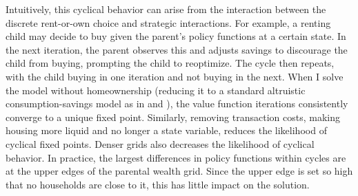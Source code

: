 \documentclass[12pt]{article}
\begin{document}
Intuitively, this cyclical behavior can arise from the interaction between the discrete rent-or-own choice and strategic interactions. For example, a renting child may decide to buy given the parent's policy functions at a certain state. In the next iteration, the parent observes this and adjusts savings to discourage the child from buying, prompting the child to reoptimize. The cycle then repeats, with the child buying in one iteration and not buying in the next. When I solve the model without homeownership (reducing it to a standard altruistic consumption-savings model as in \cite{Barczyk2020a} and \cite{Chu2020}), the value function iterations consistently converge to a unique fixed point. Similarly, removing transaction costs, making housing more liquid and no longer a state variable, reduces the likelihood of cyclical fixed points. Denser grids also decreases the likelihood of cyclical behavior. In practice, the largest differences in policy functions within cycles are at the upper edges of the parental wealth grid. Since the upper edge is set so high that no households are close to it, this has little impact on the solution.
\end{document}
